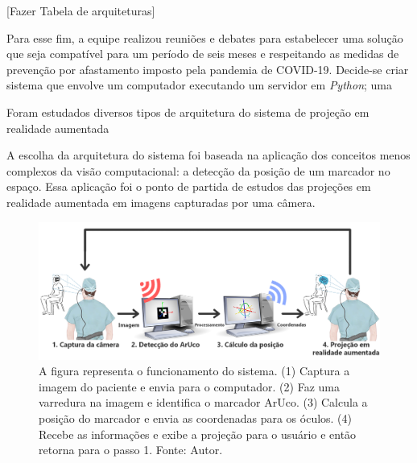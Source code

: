 [Fazer Tabela de arquiteturas]

Para esse fim, a equipe realizou reuniões e debates para estabelecer uma solução que seja compatível para um período de seis meses e respeitando as medidas de prevenção por afastamento imposto pela pandemia de COVID-19. Decide-se criar sistema que envolve um computador executando um servidor em \textit{Python}; uma 


Foram estudados diversos tipos de arquitetura do sistema de projeção em realidade aumentada

A escolha da arquitetura do sistema foi baseada na aplicação dos conceitos menos complexos da visão computacional: a detecção da posição de um marcador no espaço. Essa aplicação foi o ponto de partida de estudos das projeções em realidade aumentada em imagens capturadas por uma câmera.

\begin{figure}[ht]
    \centering
    \includegraphics[width=.9\linewidth]{figuras/System schematic.png}
    \caption{A figura representa o funcionamento do sistema. (1) Captura a imagem do paciente e envia para o computador. (2) Faz uma varredura na imagem e identifica o marcador ArUco. (3) Calcula a posição do marcador e envia as coordenadas para os óculos. (4) Recebe as informações e exibe a projeção para o usuário e então retorna para o passo 1. Fonte: Autor.}
    \label{fig:arc}
\end{figure}




